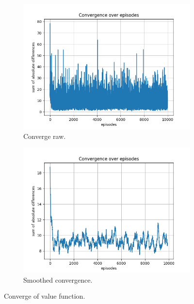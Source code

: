 \documentclass{assignment}
\begin{document}
\begin{figure}[H]
    \begin{subfigure}{0.5\textwidth}
        \includegraphics[width=\textwidth]{figures/convergence_td/epsilon_sweep/convergence_TD_alpha_0.1_gamma_0.95_epislon_0.8.png}
    \caption{Converge raw.}
    \end{subfigure}\hfill
    \begin{subfigure}{0.5\textwidth}
        \includegraphics[width=\textwidth]{figures/convergence_td/epsilon_sweep/convergence_TD_smoothed_alpha_0.1_gamma_0.95_epislon_0.8.png}
    \caption{Smoothed convergence.}
    \end{subfigure}
    \caption{Converge of value function.}
    \label{fig:epsilon_0.8_td_learning_convergence}
\end{figure}
\end{document}
